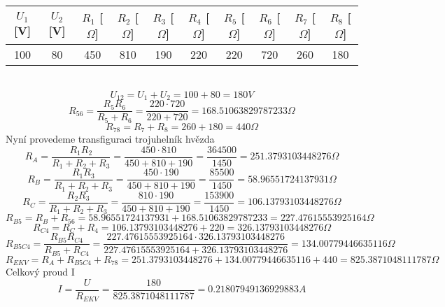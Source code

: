 \documentclass{article}
\begin{document}
\begin{tabular}{| c | c | c | c | c | c | c | c | c | c |}
  \hline
   $U_{1}$[V] & $U_{2}$ [V] & $R_{1}$ [$\Omega$]& $R_{2}$ [$\Omega$]& $R_{3}$ [$\Omega$]& $R_{4}$ [$\Omega$]& $R_{5}$ [$\Omega$]& $R_{6}$ [$\Omega$]& $R_{7}$ [$\Omega$]& $R_{8}$ [$\Omega$]\\
  \hline
  100 & 80 & 450 & 810 & 190 & 220 & 220 & 720 & 260 & 180\\
  \hline
\end{tabular}\\
\[
  U_{12} = U_{1} + U_{2} = 100 + 80 = 180V
\]
\[
  R_{56} = \displaystyle\frac{R_{5}R_{6}}{R_{5}+R_{6}}  = \displaystyle\frac{220 \cdot 720}{220 + 720} = 168.51063829787233 \Omega
\]
\[
  R_{78} = R_{7} + R_{8} = 260 + 180 = 440\Omega
\]
Nyní provedeme transfiguraci  trojuhelník hvězda
\[
  R_{A} = \displaystyle\frac{R_{1}R_{2}}{R_{1}+R_{2}+R_{3}}
  = \displaystyle\frac{450 \cdot 810}{450 + 810 + 190}
  = \displaystyle\frac{364500}{1450}
  = 251.3793103448276 \Omega
\]
\[
  R_{B} = \displaystyle\frac{R_{1}R_{3}}{R_{1}+R_{2}+R_{3}}
  = \displaystyle\frac{450 \cdot 190}{450 + 810 + 190}
  = \displaystyle\frac{85500}{1450}
  = 58.96551724137931 \Omega
\]
\[
  R_{C} = \displaystyle\frac{R_{2}R_{3}}{R_{1}+R_{2}+R_{3}}
  = \displaystyle\frac{810 \cdot 190}{450 + 810 + 190}
  = \displaystyle\frac{153900}{1450}
  = 106.13793103448276 \Omega
\]
\[
  R_{B5} = R_{B} + R_{56} = 58.96551724137931 + 168.51063829787233 = 227.47615553925164 \Omega
\]
\[
  R_{C4} = R_{C} + R_{4} = 106.13793103448276 + 220 = 326.13793103448276 \Omega
\]
\[
  R_{B5C4} = \displaystyle\frac{R_{B5}R_{C4}}{R_{B5}+R_{C4}}
  = \displaystyle\frac{227.47615553925164 \cdot  326.13793103448276}{227.47615553925164 + 326.13793103448276}
  = 134.00779446635116 \Omega
\]
\[
  R_{EKV} = R_{A} + R_{B5C4} + R_{78} = 251.3793103448276 + 134.00779446635116 + 440
  = 825.3871048111787 \Omega
\]
Celkový proud I
\[
  I = \displaystyle\frac{U}{R_{EKV}} = \displaystyle\frac{180}{825.3871048111787} = 0.21807949136929883A
\]
\end{document}
